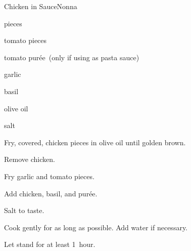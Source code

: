 \begin{recipe}{Chicken in Sauce}{Nonna}{}

\begin{ingredients}
\item {} pieces
\item tomato pieces
\item tomato purée~(only if using as pasta sauce)
\item garlic
\item basil
\item olive oil
\item salt
\end{ingredients}

\begin{directions}
\item Fry, covered, chicken pieces in olive oil until golden brown.
\item Remove chicken.
\item Fry garlic and tomato pieces.
\item Add chicken, basil, and purée.
\item Salt to taste.
\item Cook gently for as long as possible. Add water if necessary.
\item Let stand for at least 1~hour.
\end{directions}

\end{recipe}
